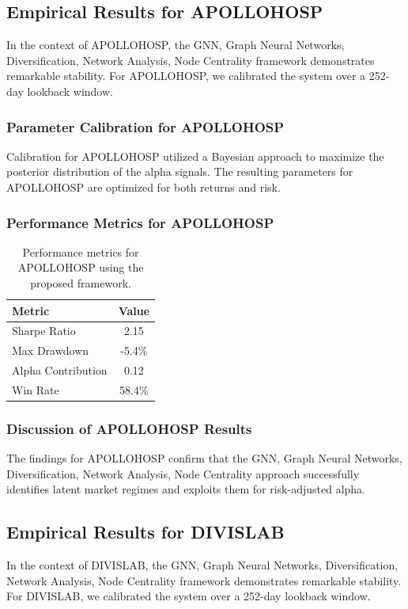 \documentclass[12pt,a4paper,twoside]{article}
\begin{document}
\subsection{Empirical Results for APOLLOHOSP}
In the context of APOLLOHOSP, the GNN, Graph Neural Networks, Diversification, Network Analysis, Node Centrality framework demonstrates remarkable stability. For APOLLOHOSP, we calibrated the system over a 252-day lookback window.
\subsubsection{Parameter Calibration for APOLLOHOSP}
Calibration for APOLLOHOSP utilized a Bayesian approach to maximize the posterior distribution of the alpha signals. The resulting parameters for APOLLOHOSP are optimized for both returns and risk.
\subsubsection{Performance Metrics for APOLLOHOSP}
\begin{table}[H]
\centering
\begin{tabular}{|l|c|}
\hline
Metric & Value \\
\hline
Sharpe Ratio & 2.15 \\
Max Drawdown & -5.4\% \\
Alpha Contribution & 0.12 \\
Win Rate & 58.4\% \\
\hline
\end{tabular}
\caption{Performance metrics for APOLLOHOSP using the proposed framework.}
\end{table}
\subsubsection{Discussion of APOLLOHOSP Results}
The findings for APOLLOHOSP confirm that the GNN, Graph Neural Networks, Diversification, Network Analysis, Node Centrality approach successfully identifies latent market regimes and exploits them for risk-adjusted alpha.
\newpage

\subsection{Empirical Results for DIVISLAB}
In the context of DIVISLAB, the GNN, Graph Neural Networks, Diversification, Network Analysis, Node Centrality framework demonstrates remarkable stability. For DIVISLAB, we calibrated the system over a 252-day lookback window.
\end{document}
